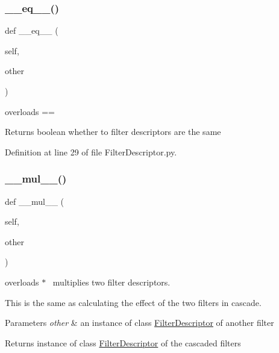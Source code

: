 \subsubsection{\texorpdfstring{\+\_\+\+\_\+eq\+\_\+\+\_\+()}{\_\_eq\_\_()}}
{\footnotesize\ttfamily def \+\_\+\+\_\+eq\+\_\+\+\_\+ (\begin{DoxyParamCaption}\item[{}]{self,  }\item[{}]{other }\end{DoxyParamCaption})}



overloads == 

\begin{DoxyReturn}{Returns}
boolean whether to filter descriptors are the same 
\end{DoxyReturn}


Definition at line 29 of file Filter\+Descriptor.\+py.

\mbox{\label{classSignalIntegrity_1_1TimeDomain_1_1Filters_1_1FilterDescriptor_1_1FilterDescriptor_a96fd98a8997501189d60829abc0257cb}} 
\subsubsection{\texorpdfstring{\+\_\+\+\_\+mul\+\_\+\+\_\+()}{\_\_mul\_\_()}}
{\footnotesize\ttfamily def \+\_\+\+\_\+mul\+\_\+\+\_\+ (\begin{DoxyParamCaption}\item[{}]{self,  }\item[{}]{other }\end{DoxyParamCaption})}



overloads $\ast$~\newline
 multiplies two filter descriptors. 

This is the same as calculating the effect of the two filters in cascade. 
\begin{DoxyParams}{Parameters}
{\em other} & an instance of class \hyperlink{classSignalIntegrity_1_1TimeDomain_1_1Filters_1_1FilterDescriptor_1_1FilterDescriptor}{Filter\+Descriptor} of another filter \\
\hline
\end{DoxyParams}
\begin{DoxyReturn}{Returns}
instance of class \hyperlink{classSignalIntegrity_1_1TimeDomain_1_1Filters_1_1FilterDescriptor_1_1FilterDescriptor}{Filter\+Descriptor} of the cascaded filters 
\end{DoxyReturn}


